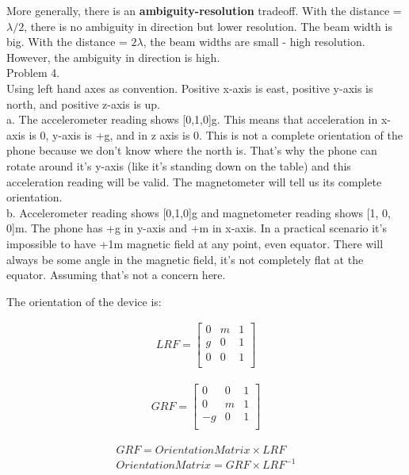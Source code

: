 \documentclass[a4paper]{article}
\begin{document}
More generally, there is an \textbf{ambiguity-resolution} tradeoff. With the distance =  $\lambda/2$, there is no ambiguity in direction but lower resolution. The beam width is big. With the distance =  $2\lambda$, the beam widths are small - high resolution. However, the ambiguity in direction is high. \\

Problem 4.\\

Using left hand axes as convention. Positive x-axis is east, positive y-axis is north, and positive z-axis is up.\\

a. The accelerometer reading shows [0,1,0]g. This means that acceleration in x-axis is 0, y-axis is +g, and in z axis is 0. This is not a complete orientation of the phone because we don't know where the north is. That's why the phone can rotate around it's y-axis (like it's standing down on the table) and this acceleration reading will be valid. The magnetometer will tell us its complete orientation.\\

b. Accelerometer reading shows [0,1,0]g and magnetometer reading shows [1, 0, 0]m. The phone has +g in y-axis and +m in x-axis. In a practical scenario it's impossible to have +1m magnetic field at any point, even equator. There will always be some angle in the magnetic field, it's not completely flat at the equator. Assuming that's not a concern here.

The orientation of the device is: 

\begin{align}
LRF = 
\begin{bmatrix}
    0 & m  & 1\\
   g & 0 & 1\\
    0 & 0 & 1\\
\end{bmatrix}
\end{align}

\begin{align}
GRF = 
\begin{bmatrix}
    0 & 0  & 1\\
   0 & m & 1\\
    -g & 0 & 1\\
\end{bmatrix}
\end{align}

\begin{align}
GRF = Orientation Matrix \times LRF\\
Orientation Matrix = GRF \times LRF^{-1}
\end{align}
\end{document}
